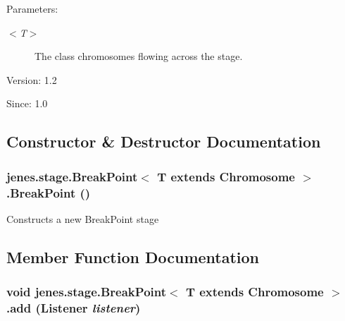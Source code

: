 \begin{Desc}
\item[Parameters:]
\begin{description}
\item[{\em $<$T$>$}]The class chromosomes flowing across the stage.\end{description}
\end{Desc}
\begin{Desc}
\item[Version:]1.2 \end{Desc}
\begin{Desc}
\item[Since:]1.0 \end{Desc}


\subsection{Constructor \& Destructor Documentation}
\hypertarget{classjenes_1_1stage_1_1_break_point_3_01_t_01extends_01_chromosome_01_4_242b4e33e148a17a0f2d19e1963aa990}{
\subsubsection[BreakPoint]{\setlength{\rightskip}{0pt plus 5cm}jenes.stage.BreakPoint$<$ T extends Chromosome $>$.BreakPoint ()}}
\label{classjenes_1_1stage_1_1_break_point_3_01_t_01extends_01_chromosome_01_4_242b4e33e148a17a0f2d19e1963aa990}


Constructs a new BreakPoint stage 

\subsection{Member Function Documentation}
\hypertarget{classjenes_1_1stage_1_1_break_point_3_01_t_01extends_01_chromosome_01_4_ac70bbcb2e82710fe969bf1545c3a9f4}{
\subsubsection[add]{\setlength{\rightskip}{0pt plus 5cm}void jenes.stage.BreakPoint$<$ T extends Chromosome $>$.add (Listener {\em listener})}}
\label{classjenes_1_1stage_1_1_break_point_3_01_t_01extends_01_chromosome_01_4_ac70bbcb2e82710fe969bf1545c3a9f4}


